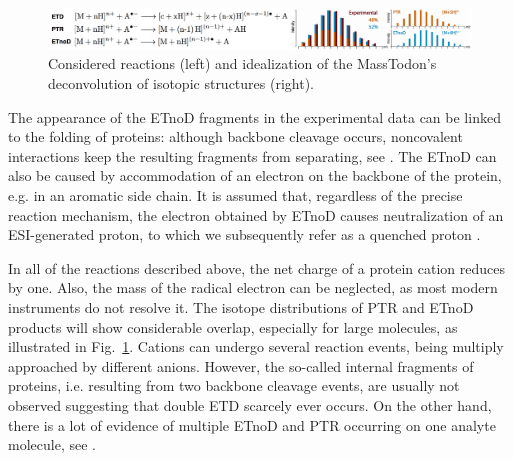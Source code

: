 \documentclass{llncs}
\begin{document}
        \begin{figure}[h]
                \includegraphics[width=\textwidth]{reactionMassTodon.png}
                \caption{Considered reactions (left) and idealization of the MassTodon's deconvolution of isotopic structures (right).}\label{img::reactionsMassTodon}
        \end{figure}



        The appearance of the ETnoD fragments in the experimental data can be linked to the folding of proteins: although backbone cleavage occurs, noncovalent interactions keep the resulting fragments from separating, see \cite{Lermyte2014-vu,Lermyte2015-oy}. The ETnoD can also be caused by accommodation of an electron on the backbone of the protein, e.g. in an aromatic side chain. It is assumed that, regardless of the precise reaction mechanism, the electron obtained by ETnoD causes neutralization of an ESI-generated proton, to which we subsequently refer as a quenched proton \cite{Lermyte2015-lm}.

        In all of the reactions described above, the net charge of a protein cation reduces by one. Also, the mass of the radical electron can be neglected, as most modern instruments do not resolve it. The isotope distributions of PTR and ETnoD products will show considerable overlap, especially for large molecules, as illustrated in Fig.~\ref{img::reactionsMassTodon}. Cations can undergo several reaction events, being multiply approached by different anions. However, the so-called internal fragments of proteins, i.e. resulting from two backbone cleavage events, are usually not observed suggesting that double ETD scarcely ever occurs. On the other hand, there is a lot of evidence of multiple ETnoD and PTR occurring on one analyte molecule, see \cite{Lermyte2015-li}.
\end{document}
